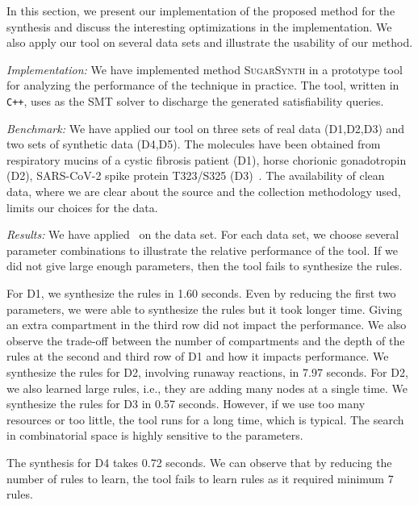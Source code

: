 In this section, we  present our implementation of the proposed method for the synthesis
and discuss the interesting optimizations in the implementation.
%
We also apply our tool on several data sets and illustrate the usability of our method.

{\em Implementation:} 
We have implemented method \textsc{SugarSynth} in a prototype tool {\ourtool} for
analyzing the performance of the technique in practice.
%
The tool, written in {\tt C++}, uses {\zthree}\cite{z3} as the SMT solver
to discharge the generated satisfiability queries.
%


{\em Benchmark: }
We have applied our tool on three sets of real data (D1,D2,D3) and two sets of synthetic data (D4,D5). The molecules have been obtained from
respiratory mucins of a cystic fibrosis patient (D1),
horse chorionic gonadotropin (D2), SARS-CoV-2 spike protein T323/S325 (D3)~\cite{}.
The availability of clean data, where we are clear about the source and the collection
methodology used, limits our choices for the data.



{\em Results:} We have applied \ourtool~on the data set. For each data set, we choose several
parameter combinations to illustrate the relative performance of the tool.
If we did not give large enough parameters, then the tool fails to synthesize the rules.

For D1, we synthesize the rules in 1.60 seconds. Even by reducing the first two parameters, we were able to synthesize the rules but it took longer time.
Giving an extra compartment in the third row did not impact the performance.  We also observe the trade-off between the number of compartments
and the depth of the rules at the second and third row of D1 and how it impacts performance.
We synthesize the rules for D2, involving runaway reactions,  in 7.97 seconds.
For D2, we also learned large rules, i.e., they are adding many nodes at a single time.
We synthesize the rules for D3 in 0.57 seconds. 
However, if we use too many resources or too little, the tool runs for a long time,
which is typical. The search in combinatorial space is highly sensitive to the parameters.

The synthesis for D4 takes 0.72 seconds. We can observe that by reducing the number of rules to learn, the tool fails to learn rules as it required minimum 7 rules.

